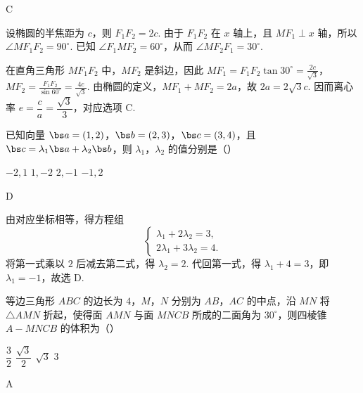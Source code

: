 \begin{answer}
C
\end{answer}

\begin{solution}
设椭圆的半焦距为 \(c\)，则 \(F_{1}F_{2}=2c\). 由于 \(F_{1}F_{2}\) 在 \(x\) 轴上，且 \(MF_{1}\perp x\) 轴，所以 \(\angle MF_{1}F_{2}=90^{\circ}\). 已知 \(\angle F_{1}MF_{2}=60^{\circ}\)，从而 \(\angle MF_{2}F_{1}=30^{\circ}\).

在直角三角形 \(MF_{1}F_{2}\) 中，\(MF_{2}\) 是斜边，因此
\(MF_{1}=F_{1}F_{2}\tan30^{\circ}=\frac{2c}{\sqrt{3}}\)，\(MF_{2}=\frac{F_{1}F_{2}}{\sin60^{\circ}}=\frac{4c}{\sqrt{3}}\).
由椭圆的定义，\(MF_{1}+MF_{2}=2a\)，故 \(2a=2\sqrt{3}c\). 因而离心率
\(e=\dfrac{c}{a}=\dfrac{\sqrt{3}}{3}\)，对应选项 C.
\end{solution}

\begin{problem}
已知向量 \(\bs a=(1,2)\)，\(\bs b=(2,3)\)，\(\bs c=(3,4)\)，且 \(\bs c=\lambda_{1}\bs a+\lambda_{2}\bs b\)，则 \(\lambda_{1}\)，\(\lambda_{2}\) 的值分别是（\quad）

\choices
    {\(-2,1\)}
    {\(1,-2\)}
    {\(2,-1\)}
    {\(-1,2\)}
\end{problem}

\begin{answer}
D
\end{answer}

\begin{solution}
由对应坐标相等，得方程组
\[
\begin{cases}
\lambda_{1}+2\lambda_{2}=3,\\
2\lambda_{1}+3\lambda_{2}=4.
\end{cases}
\]
将第一式乘以 \(2\) 后减去第二式，得 \(\lambda_{2}=2\). 代回第一式，得 \(\lambda_{1}+4=3\)，即 \(\lambda_{1}=-1\)，故选 D.
\end{solution}

\begin{problem}
等边三角形 \(ABC\) 的边长为 \(4\)，\(M\)，\(N\) 分别为 \(AB\)，\(AC\) 的中点，沿 \(MN\) 将 \(\triangle AMN\) 折起，使得面 \(AMN\) 与面 \(MNCB\) 所成的二面角为 \(30^{\circ}\)，则四棱锥 \(A-MNCB\) 的体积为（\quad）

\choices
    {\(\dfrac{3}{2}\)}
    {\(\dfrac{\sqrt{3}}{2}\)}
    {\(\sqrt{3}\)}
    {\(3\)}
\end{problem}

\begin{answer}
A
\end{answer}

